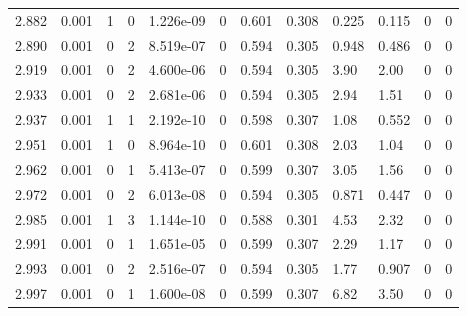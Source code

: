 \documentclass[preview]{standalone}
\begin{document}
{{{{{{\begin{tabular}{L{1.2cm}C{1.2cm} C{0.3cm}C{0.5cm} C{1.4cm}C{1.4cm} C{1.4cm}C{1.4cm} C{1.6cm}C{1.6cm} C{1.6cm}C{1.6cm}}
  2.882  &  0.001  & 1     &  0 &  1.226e-09  & 0  &  0.601&   0.308& 0.225 & 0.115   &  0 & 0  \\ 
  2.890  &  0.001  & 0     &  2 &  8.519e-07  & 0  &  0.594&   0.305& 0.948 & 0.486   &  0 & 0  \\ 
  2.919  &  0.001  & 0     &  2 &  4.600e-06  & 0  &  0.594&   0.305& 3.90 & 2.00   &  0 & 0  \\ 
  2.933  &  0.001  & 0     &  2 &  2.681e-06  & 0  &  0.594&   0.305& 2.94 & 1.51   &  0 & 0  \\ 
  2.937  &  0.001  & 1     &  1 &  2.192e-10  & 0  &  0.598&   0.307& 1.08 & 0.552   &  0 & 0  \\ 
  2.951  &  0.001  & 1     &  0 &  8.964e-10  & 0  &  0.601&   0.308& 2.03 & 1.04   &  0 & 0  \\ 
  2.962  &  0.001  & 0     &  1 &  5.413e-07  & 0  &  0.599&   0.307& 3.05 & 1.56   &  0 & 0  \\ 
  2.972  &  0.001  & 0     &  2 &  6.013e-08  & 0  &  0.594&   0.305& 0.871 & 0.447   &  0 & 0  \\ 
  2.985  &  0.001  & 1     &  3 &  1.144e-10  & 0  &  0.588&   0.301& 4.53 & 2.32   &  0 & 0  \\ 
  2.991  &  0.001  & 0     &  1 &  1.651e-05  & 0  &  0.599&   0.307& 2.29 & 1.17   &  0 & 0  \\ 
  2.993  &  0.001  & 0     &  2 &  2.516e-07  & 0  &  0.594&   0.305& 1.77 & 0.907   &  0 & 0  \\ 
  2.997  &  0.001  & 0     &  1 &  1.600e-08  & 0  &  0.599&   0.307& 6.82 & 3.50   &  0 & 0  \\ 
\hline 
\end{tabular} 

}}}}}}
\end{document}
